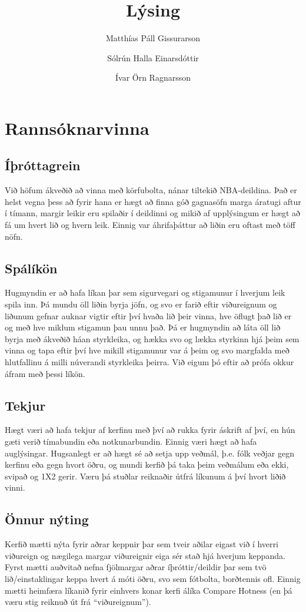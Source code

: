 \documentclass[a4paper,11pt]{article}
\title{Lýsing} \author{Matthías Páll Gissurarson  \and Sólrún Halla Einarsdóttir \and Ívar Örn Ragnarsson}
\begin{document}
\maketitle
\section{Rannsóknarvinna}
\subsection{Íþróttagrein}
Við höfum ákveðið að vinna með körfubolta, nánar tiltekið NBA-deildina. Það er helst
vegna þess að fyrir hana er hægt að finna góð gagnasöfn marga áratugi
aftur í tímann, margir leikir eru spilaðir í deildinni og mikið af
upplýsingum er hægt að fá um hvert lið og hvern leik. Einnig var
áhrifaþáttur að liðin eru oftast með töff nöfn.

\subsection{Spálíkön}
Hugmyndin er að hafa líkan þar sem sigurvegari og stigamunur í hverjum leik spila inn. 
Þá mundu öll liðin byrja jöfn, og svo er farið
eftir viðureignum og liðunum gefnar auknar vigtir eftir því hvaða lið
þeir vinna, hve öflugt það lið er og með hve miklum stigamun þau unnu það. 
Þá er hugmyndin að láta öll lið byrja með ákveðið háan
styrkleika, og hækka svo og lækka styrkinn hjá þeim sem vinna og tapa
eftir því hve mikill stigamunur var á þeim og svo margfalda með
hlutfallinu á milli núverandi styrkleika þeirra. Við eigum þó eftir
að prófa okkur áfram með þessi líkön.

\subsection{Tekjur}
Hægt væri að hafa tekjur af kerfinu með því að rukka fyrir áskrift af
því, en hún gæti verið tímabundin eða notkunarbundin. Einnig væri hægt
að hafa auglýsingar. Hugsanlegt er að hægt sé að setja upp veðmál,
þ.e. fólk veðjar gegn kerfinu eða gegn hvort öðru, og mundi kerfið þá
taka þeim veðmálum eða ekki, svipað og 1X2 gerir. Væru þá stuðlar
reiknaðir útfrá líkunum á því hvort liðið vinni.

\subsection{Önnur nýting}
Kerfið mætti nýta fyrir aðrar keppnir þar sem tveir aðilar eigast við í hverri 
viðureign og nægilega margar viðureignir eiga sér stað hjá hverjum keppanda. 
Fyrst mætti auðvitað nefna fjölmargar aðrar íþróttir/deildir þar sem tvö lið/einstaklingar 
keppa hvert á móti öðru, svo sem fótbolta, borðtennis ofl. 
Einnig mætti heimfæra líkanið fyrir einhvers konar kerfi álíka Compare Hotness (en þá væru stig reiknuð út
frá ``viðureignum'').
\end{document}
